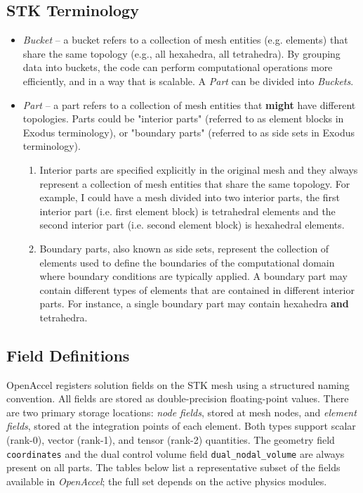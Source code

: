 \documentclass[12pt]{extarticle}
\newcommand{\<}{\langle}
\renewcommand{\>}{\rangle}
\theoremstyle{definition}
\begin{document}
\subsection{STK Terminology}
\begin{itemize}
    \item \textit{Bucket} -- a bucket refers to a collection of mesh entities (e.g. elements) that share the same topology (e.g., all hexahedra, all tetrahedra). By grouping data into buckets, the code can perform computational operations more efficiently, and in a way that is scalable. A \textit{Part} can be divided into \textit{Buckets}.

   \item \textit{Part} -- a part refers to a collection of mesh entities that \textbf{might} have different topologies. Parts could be "interior parts" (referred to as element blocks in Exodus terminology), or "boundary parts" (referred to as side sets in Exodus terminology).  

   \begin{enumerate}
       \item Interior parts are specified explicitly in the original mesh and they always represent a collection of mesh entities that share the same topology. For example, I could have a mesh divided into two interior parts, the first interior part (i.e. first element block) is tetrahedral elements and the second interior part (i.e. second element block) is hexahedral elements.

       \item Boundary parts, also known as side sets, represent the collection of elements used to define the boundaries of the computational domain where boundary conditions are typically applied. A boundary part may contain different types of elements that are contained in different interior parts. For instance, a single boundary part may contain hexahedra \textbf{and} tetrahedra.
   \end{enumerate}

\end{itemize}

\subsection{Field Definitions}

OpenAccel registers solution fields on the STK mesh using a structured naming convention. All fields are stored as double-precision floating-point values. There are two primary storage locations: \textit{node fields}, stored at mesh nodes, and \textit{element fields}, stored at the integration points of each element. Both types support scalar (rank-0), vector (rank-1), and tensor (rank-2) quantities. The geometry field \texttt{coordinates} and the dual control volume field \texttt{dual\_nodal\_volume} are always present on all parts. The tables below list a representative subset of the fields available in \textit{OpenAccel}; the full set depends on the active physics modules.
\end{document}
